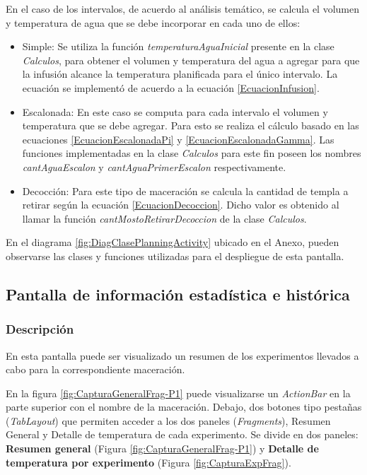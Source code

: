             \par En el caso de los intervalos, de acuerdo al análisis temático, se calcula el volumen y temperatura de agua que se debe incorporar en cada uno de ellos:
            \begin{itemize}
                \item Simple: Se utiliza la función \textit{temperaturaAguaInicial} presente en la clase \textit{Calculos}, para obtener el volumen y temperatura del agua a agregar para que la infusión alcance la temperatura planificada para el único intervalo. La ecuación se implementó de acuerdo a la ecuación \ref{EcuacionInfusion}.
                
                \item Escalonada: En este caso se computa para cada intervalo el volumen y temperatura que se debe agregar. Para esto se realiza el cálculo basado en las ecuaciones \ref{EcuacionEscalonadaPi} y \ref{EcuacionEscalonadaGamma}. Las funciones implementadas en la clase \textit{Calculos} para este fin poseen los nombres \textit{cantAguaEscalon} y \textit{cantAguaPrimerEscalon} respectivamente.
                
                \item Decocción: Para este tipo de maceración se calcula la cantidad de templa a retirar según la ecuación \ref{EcuacionDecoccion}. Dicho valor es obtenido al llamar la función \textit{cantMostoRetirarDecoccion} de la clase \textit{Calculos}.
            \end{itemize}
            
            \par En el diagrama \ref{fig:DiagClasePlanningActivity} ubicado en el Anexo, pueden observarse las clases y funciones utilizadas para el despliegue de esta pantalla.
            
        \subsection{Pantalla de información estadística e histórica}
        \label{DescripPantallaEstadística}
            \subsubsection{Descripción}
            \par En esta pantalla puede ser visualizado un resumen de los experimentos llevados a cabo para la correspondiente maceración.
            \par En la figura \ref{fig:CapturaGeneralFrag-P1} puede visualizarse un \textit{ActionBar} en la parte superior con el nombre de la maceración. Debajo, dos botones tipo pestañas (\textit{TabLayout}) que permiten acceder a los dos paneles (\textit{Fragments}), Resumen General y Detalle de temperatura de cada experimento. 
            Se divide en dos paneles: \textbf{Resumen general} (Figura \ref{fig:CapturaGeneralFrag-P1}) y \textbf{Detalle de temperatura por experimento} (Figura \ref{fig:CapturaExpFrag}).
            
